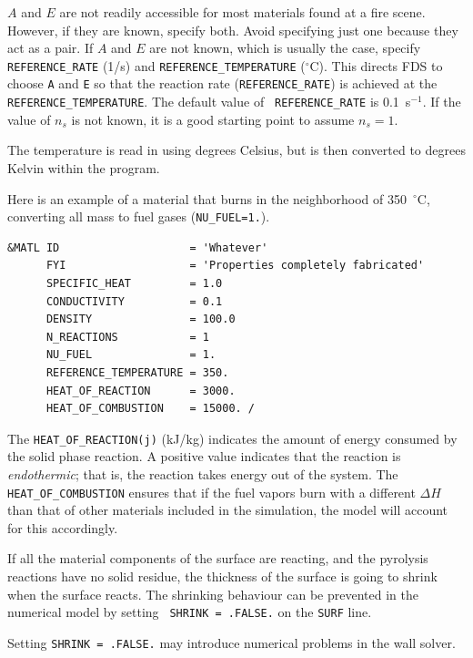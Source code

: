 \documentclass[11pt]{book}
\newcommand{\ct}{\tt\small}
\begin{document}
$A$ and $E$  are not readily accessible for most materials found at a
fire scene. However, if they are known, specify both. Avoid specifying
just one because they act as a pair.  If $A$ and $E$ are not known,
which is usually the case, specify {\ct REFERENCE\_RATE} (1/s) and
{\ct REFERENCE\_TEMPERATURE} ($^\circ$C). This directs FDS to choose
{\ct A} and {\ct E} so that the reaction rate ({\ct REFERENCE\_RATE})
is achieved at the {\ct REFERENCE\_TEMPERATURE}. The default value of {\ct
REFERENCE\_RATE} is 0.1~s$^{-1}$. If the value of $n_s$ is not known,
it is a good starting point to assume $n_s=1$.
\begin{warning}
\noindent
The temperature is read in using degrees Celsius, but is then converted to
degrees Kelvin within the program.
\end{warning}

Here is an example of a material that burns in the neighborhood of 350~$^\circ$C,
converting all mass to fuel gases ({\ct NU\_FUEL=1.}).

\footnotesize
\begin{verbatim}
&MATL ID                    = 'Whatever'
      FYI                   = 'Properties completely fabricated'
      SPECIFIC_HEAT         = 1.0
      CONDUCTIVITY          = 0.1
      DENSITY               = 100.0
      N_REACTIONS           = 1
      NU_FUEL               = 1.
      REFERENCE_TEMPERATURE = 350.
      HEAT_OF_REACTION      = 3000.
      HEAT_OF_COMBUSTION    = 15000. /
\end{verbatim}
\normalsize
\noindent
The {\ct HEAT\_OF\_REACTION(j)} (kJ/kg) indicates the amount of energy
consumed by the solid phase reaction. A positive value indicates that
the reaction is {\em endothermic}; that is, the reaction takes energy
out of the system. The {\ct HEAT\_OF\_COMBUSTION} ensures that if the
fuel vapors burn with a different $\Delta H$ than that of other
materials included in the simulation, the model will account for this
accordingly.

If all the material components of the surface are reacting, and the
pyrolysis reactions have no solid residue, the thickness of the
surface is going to shrink when the surface reacts. The shrinking
behaviour can be prevented in the numerical model by setting {\ct
SHRINK = .FALSE.} on the {\ct SURF} line.
\begin{warning}
\noindent
Setting {\ct SHRINK = .FALSE.} may introduce numerical problems in the
wall solver.
\end{warning}
\end{document}
